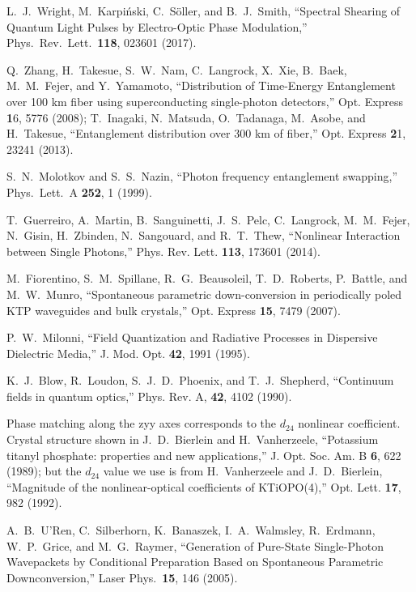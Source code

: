 \documentclass[twocolumn,amssymb, nobibnotes, showpacs, aps, pra,10pt]{revtex4-1}
\begin{document}
\begin{thebibliography}{99}
 L.~J.~Wright, M.~Karpi\'nski, C.~S\"oller, and B.~J.~Smith, ``Spectral Shearing of Quantum Light Pulses by Electro-Optic Phase Modulation,'' Phys.~Rev.~Lett.\ {\bf 118}, 023601 (2017).

 Q.~Zhang, H.~Takesue, S.~W.~Nam, C.~Langrock, X.~Xie, B.~Baek, M.~M.~Fejer, and Y.~Yamamoto, ``Distribution of Time-Energy Entanglement over 100 km fiber using superconducting single-photon detectors,'' Opt. Express {\textbf 16}, 5776 (2008); T.~Inagaki, N.~Matsuda, O.~Tadanaga, M.~Asobe, and H.~Takesue, ``Entanglement distribution over 300 km of fiber,'' Opt. Express {\textbf 21}, 23241 (2013).

S.~N.~Molotkov and S.~S.~Nazin, ``Photon frequency entanglement swapping,'' Phys.~Lett.~A {\bf252}, 1 (1999).

T.~Guerreiro, A.~Martin, B.~Sanguinetti, J.~S.~Pelc, C.~Langrock, M.~M.~Fejer, N.~Gisin, H.~Zbinden, N.~Sangouard, and R.~T.~Thew, ``Nonlinear Interaction between Single Photons,'' Phys. Rev. Lett. {\bf 113}, 173601 (2014).

 M.~Fiorentino, S.~M.~Spillane, R.~G.~Beausoleil, T.~D.~Roberts, P.~Battle, and M.~W.~Munro, ``Spontaneous parametric down-conversion in periodically poled KTP waveguides and bulk crystals,'' Opt. Express {\bf 15}, 7479 (2007).

 P.~W.~Milonni, ``Field Quantization and Radiative Processes in Dispersive Dielectric Media,'' J. Mod. Opt. {\bf 42}, 1991 (1995).

 K.~J.~Blow, R.~Loudon, S.~J.~D.~Phoenix, and T.~J.~Shepherd, ``Continuum fields in quantum optics,'' Phys. Rev. A, {\bf 42}, 4102 (1990).

 Phase matching along the zyy axes corresponds to the $d_{24}$ nonlinear coefficient. Crystal structure shown in J.~D.~Bierlein and H.~Vanherzeele, ``Potassium titanyl phosphate: properties and new applications,'' J. Opt. Soc. Am. B {\bf 6}, 622 (1989); but the $d_{24}$ value we use is from H.~Vanherzeele and J.~D.~Bierlein, ``Magnitude of the nonlinear-optical coefficients of KTiOPO(4),'' Opt. Lett. {\bf 17}, 982 (1992).

 A.~B.~U'Ren, C.~Silberhorn, K.~Banaszek, I.~A.~Walmsley, R.~Erdmann, W.~P.~Grice, and M.~G.~Raymer, ``Generation of Pure-State Single-Photon Wavepackets by Conditional Preparation Based on Spontaneous Parametric Downconversion,'' Laser Phys.\ {\bf 15}, 146 (2005).


\end{thebibliography}
\end{document}
